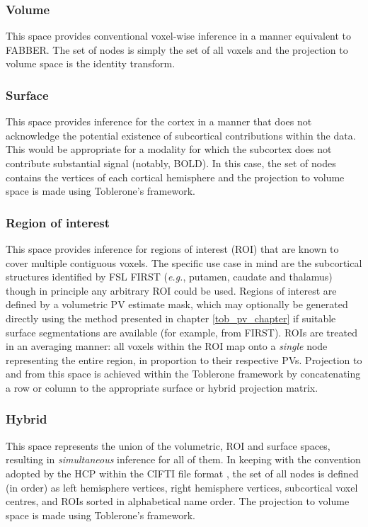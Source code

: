 \documentclass[12pt]{report}
\begin{document}
\subsubsection{Volume}

This space provides conventional voxel-wise inference in a manner equivalent to FABBER. The set of nodes is simply the set of all voxels and the projection to volume space is the identity transform.  

\subsubsection{Surface}

This space provides inference for the cortex in a manner that does not acknowledge the potential existence of subcortical contributions within the data. This would be appropriate for a modality for which the subcortex does not contribute substantial signal (notably, BOLD). In this case, the set of nodes contains the vertices of each cortical hemisphere and the projection to volume space is made using Toblerone's framework. 

\subsubsection{Region of interest}

This space provides inference for regions of interest (ROI) that are known to cover multiple contiguous voxels. The specific use case in mind are the subcortical structures identified by FSL FIRST (\textit{e.g.}, putamen, caudate and thalamus) though in principle any arbitrary ROI could be used. Regions of interest are defined by a volumetric PV estimate mask, which may optionally be generated directly using the method presented in chapter \ref{tob_pv_chapter} if suitable surface segmentations are available (for example, from FIRST). ROIs are treated in an averaging manner: all voxels within the ROI map onto a \textit{single} node representing the entire region, in proportion to their respective PVs. Projection to and from this space is achieved within the Toblerone framework by concatenating a row or column to the appropriate surface or hybrid projection matrix. 

\subsubsection{Hybrid}

This space represents the union of the volumetric, ROI and surface spaces, resulting in \textit{simultaneous} inference for all of them. In keeping with the convention adopted by the HCP within the CIFTI file format \cite{Glasser2013}, the set of all nodes is defined (in order) as left hemisphere vertices, right hemisphere vertices, subcortical voxel centres, and ROIs sorted in alphabetical name order. The projection to volume space is made using Toblerone's framework. 
\end{document}
